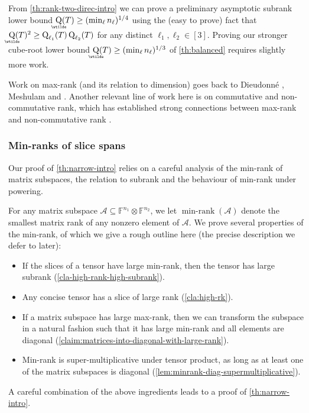 \documentclass{daj}
\DeclareMathOperator{\subrank}{Q}
\DeclareMathOperator{\asympsubrank}{\underaccent{\wtilde}{Q}}
\newcommand{\FF}{\mathbb{F}}
\DeclareMathOperator{\minrank}{min-rank}
\begin{document}
From \autoref{th:rank-two-direc-intro}  we can prove a preliminary asymptotic subrank lower bound $\asympsubrank(T) \geq (\min_\ell n_\ell)^{1/4}$ using the (easy to prove) fact that $\asympsubrank(T)^2 \geq \subrank_{\ell_1}(T) \subrank_{\ell_2}(T)$ for any distinct ${\ell_1},{\ell_2} \in [3]$. Proving our stronger cube-root lower bound $\asympsubrank(T) \geq (\min_\ell n_\ell)^{1/3}$ of \autoref{th:balanced} requires slightly more work.

Work on max-rank (and its relation to dimension) goes back to Dieudonn\'{e} \cite{MR29360}, Meshulam \cite{meshulam1985maximal} and \cite{flanders1962spaces}. Another relevant line of work here is on commutative and non-commutative rank, which has established strong connections between max-rank and non-commutative rank \cite{cohn1995skewfields,MR2123060,derksen2018ncrk}.

\subsubsection{Min-ranks of slice spans}

Our proof of \autoref{th:narrow-intro} relies on a careful analysis of the min-rank of matrix subspaces, the relation to subrank and the behaviour of min-rank under powering.

For any matrix subspace $\mathcal{A} \subseteq \FF^{n_1} \otimes \FF^{n_2}$, we let $\minrank(\mathcal{A})$ denote the smallest matrix rank of any nonzero element of $\mathcal{A}$. We prove several properties of the min-rank, of which we give a rough outline here (the precise description we defer to later):
\begin{itemize}
    \item If the slices of a tensor have large min-rank, then the tensor has large subrank (\autoref{cla-high-rank-high-subrank}). %
    \item Any concise tensor has a slice of large rank (\autoref{cla:high-rk}).
    \item If a matrix subspace has large max-rank, then we can transform the subspace in a natural fashion such that it has large min-rank and all elements are diagonal (\autoref{claim:matrices-into-diagonal-with-large-rank}).
    \item Min-rank is super-multiplicative under tensor product, as long as at least one of the matrix subspaces is diagonal (\autoref{lem:minrank-diag-supermultiplicative}).
\end{itemize}
A careful combination of the above ingredients leads to a proof of \autoref{th:narrow-intro}.
\end{document}
